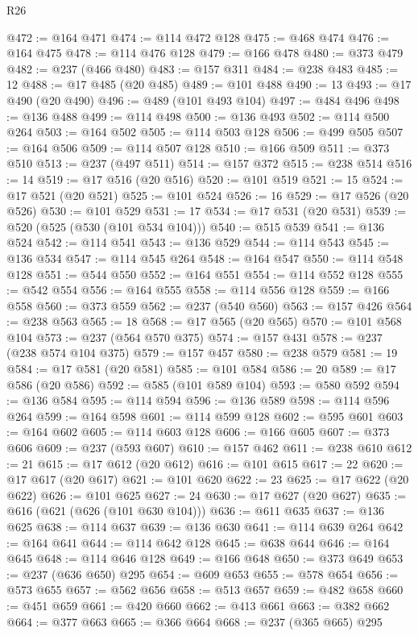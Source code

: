 \begin{lexlean}{R26}
\begin{coremodule}
@472 := @164 @471
@474 := @114 @472 @128
@475 := @468 @474
@476 := @164 @475
@478 := @114 @476 @128
@479 := @166 @478
@480 := @373 @479
@482 := @237 (@466 @480)
@483 := @157 @311
@484 := @238 @483
@485 := 12
@488 := @17 @485 (@20 @485)
@489 := @101 @488
@490 := 13
@493 := @17 @490 (@20 @490)
@496 := @489 (@101 @493 @104)
@497 := @484 @496
@498 := @136 @488
@499 := @114 @498
@500 := @136 @493
@502 := @114 @500 @264
@503 := @164 @502
@505 := @114 @503 @128
@506 := @499 @505
@507 := @164 @506
@509 := @114 @507 @128
@510 := @166 @509
@511 := @373 @510
@513 := @237 (@497 @511)
@514 := @157 @372
@515 := @238 @514
@516 := 14
@519 := @17 @516 (@20 @516)
@520 := @101 @519
@521 := 15
@524 := @17 @521 (@20 @521)
@525 := @101 @524
@526 := 16
@529 := @17 @526 (@20 @526)
@530 := @101 @529
@531 := 17
@534 := @17 @531 (@20 @531)
@539 := @520 (@525 (@530 (@101 @534 @104)))
@540 := @515 @539
@541 := @136 @524
@542 := @114 @541
@543 := @136 @529
@544 := @114 @543
@545 := @136 @534
@547 := @114 @545 @264
@548 := @164 @547
@550 := @114 @548 @128
@551 := @544 @550
@552 := @164 @551
@554 := @114 @552 @128
@555 := @542 @554
@556 := @164 @555
@558 := @114 @556 @128
@559 := @166 @558
@560 := @373 @559
@562 := @237 (@540 @560)
@563 := @157 @426
@564 := @238 @563
@565 := 18
@568 := @17 @565 (@20 @565)
@570 := @101 @568 @104
@573 := @237 (@564 @570 @375)
@574 := @157 @431
@578 := @237 (@238 @574 @104 @375)
@579 := @157 @457
@580 := @238 @579
@581 := 19
@584 := @17 @581 (@20 @581)
@585 := @101 @584
@586 := 20
@589 := @17 @586 (@20 @586)
@592 := @585 (@101 @589 @104)
@593 := @580 @592
@594 := @136 @584
@595 := @114 @594
@596 := @136 @589
@598 := @114 @596 @264
@599 := @164 @598
@601 := @114 @599 @128
@602 := @595 @601
@603 := @164 @602
@605 := @114 @603 @128
@606 := @166 @605
@607 := @373 @606
@609 := @237 (@593 @607)
@610 := @157 @462
@611 := @238 @610
@612 := 21
@615 := @17 @612 (@20 @612)
@616 := @101 @615
@617 := 22
@620 := @17 @617 (@20 @617)
@621 := @101 @620
@622 := 23
@625 := @17 @622 (@20 @622)
@626 := @101 @625
@627 := 24
@630 := @17 @627 (@20 @627)
@635 := @616 (@621 (@626 (@101 @630 @104)))
@636 := @611 @635
@637 := @136 @625
@638 := @114 @637
@639 := @136 @630
@641 := @114 @639 @264
@642 := @164 @641
@644 := @114 @642 @128
@645 := @638 @644
@646 := @164 @645
@648 := @114 @646 @128
@649 := @166 @648
@650 := @373 @649
@653 := @237 (@636 @650) @295
@654 := @609 @653
@655 := @578 @654
@656 := @573 @655
@657 := @562 @656
@658 := @513 @657
@659 := @482 @658
@660 := @451 @659
@661 := @420 @660
@662 := @413 @661
@663 := @382 @662
@664 := @377 @663
@665 := @366 @664
@668 := @237 (@365 @665) @295

\end{coremodule}
\end{lexlean}
